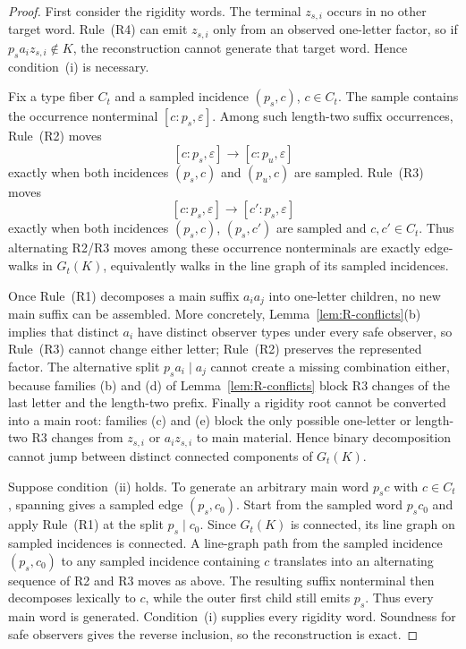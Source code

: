 \documentclass[11pt]{article}
\theoremstyle{definition}
\theoremstyle{remark}
\newcommand{\eps}{\varepsilon}
\begin{document}
\begin{proof}
First consider the rigidity words.  The terminal \(z_{s,i}\) occurs in no
other target word.  Rule~(R4) can emit \(z_{s,i}\) only from an observed
one-letter factor, so if \(p_sa_i z_{s,i}\notin K\), the reconstruction
cannot generate that target word.  Hence condition~(i) is necessary.

Fix a type fiber \(C_t\) and a sampled incidence \((p_s,c)\),
\(c\in C_t\).  The sample contains the occurrence nonterminal
\([c:p_s,\eps]\).  Among such length-two suffix occurrences, Rule~(R2)
moves
\[
 [c:p_s,\eps]\longrightarrow[c:p_u,\eps]
\]
exactly when both incidences \((p_s,c)\) and \((p_u,c)\) are sampled.
Rule~(R3) moves
\[
 [c:p_s,\eps]\longrightarrow[c':p_s,\eps]
\]
exactly when both incidences \((p_s,c)\), \((p_s,c')\) are sampled and
\(c,c'\in C_t\).  Thus alternating R2/R3 moves among these occurrence
nonterminals are exactly edge-walks in \(G_t(K)\), equivalently walks in the
line graph of its sampled incidences.

Once Rule~(R1) decomposes a main suffix \(a_i a_j\) into one-letter
children, no new main suffix can be assembled.  More concretely,
Lemma~\ref{lem:R-conflicts}(b) implies that distinct \(a_i\) have distinct
observer types under every safe observer, so Rule~(R3) cannot change either
letter; Rule~(R2) preserves the represented factor.  The alternative split
\(p_sa_i\mid a_j\) cannot create a missing combination either, because
families (b) and (d) of Lemma~\ref{lem:R-conflicts} block R3 changes of the
last letter and the length-two prefix.  Finally a rigidity root cannot be
converted into a main root: families (c) and (e) block the only possible
one-letter or length-two R3 changes from \(z_{s,i}\) or
\(a_i z_{s,i}\) to main material.  Hence binary decomposition cannot jump
between distinct connected components of \(G_t(K)\).

Suppose condition~(ii) holds.  To generate an arbitrary main word \(p_sc\)
with \(c\in C_t\), spanning gives a sampled edge \((p_s,c_0)\).  Start
from the sampled word \(p_sc_0\) and apply Rule~(R1) at the split
\(p_s\mid c_0\).  Since \(G_t(K)\) is connected, its line graph on sampled incidences is
connected.  A line-graph path from the sampled incidence \((p_s,c_0)\) to
any sampled incidence containing \(c\) translates into an alternating
sequence of R2 and R3 moves as above.  The resulting suffix
nonterminal then decomposes lexically to \(c\), while the outer first child
still emits \(p_s\).  Thus every main word is generated.  Condition~(i)
supplies every rigidity word.  Soundness for safe observers gives the reverse
inclusion, so the reconstruction is exact.


\end{proof}
\end{document}

